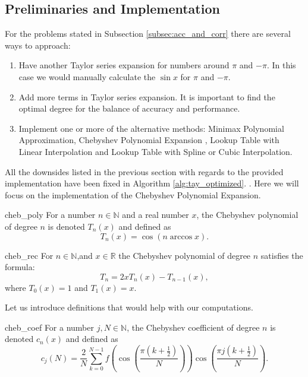 \documentclass[12pt]{article}
\begin{document}
\subsection{Preliminaries and Implementation}
For the problems stated in Subsection \ref{subsec:acc_and_corr} there are several ways to approach:
\begin{enumerate}
    \item Have another Taylor series expansion for numbers around $\pi$ and $-\pi$. In this case we would manually calculate the $\sin x$ for $\pi$ and $-\pi$.
    \item  Add more terms in Taylor series expansion. It is important to find the optimal degree for the balance of accuracy and performance.
    \item Implement one or more of the alternative methods: Minimax Polynomial Approximation, Chebyshev Polynomial Expansion \cite{press2007numerical}, Lookup Table with Linear Interpolation and Lookup Table with Spline or Cubic Interpolation.
\end{enumerate}
All the downsides listed in the previous section with regards to the provided implementation have been fixed in Algorithm \ref{alg:tay_optimized}.
.
Here we will focus on the implementation of the Chebyshev Polynomial Expansion.

\begin{DefinitionColor}{\cite[p~.233]{press2007numerical}}{cheb_poly}
    For a number $n\in \mathbb{N}$ and a real number $x$, the Chebyshev polynomial of degree $n$ is denoted $T_n(x)$ and defined as
    \begin{equation*}
        T_n(x) = \cos(n \arccos x).
    \end{equation*}
\end{DefinitionColor}

\begin{TheoremColor}{}{cheb_rec}
    For $n \in \mathbb{N}$,and $x \in \mathbb{R}$ the Chebyshev polynomial of degree $n$ satisfies the formula:
    \begin{equation*}
        T_n=2xT_n(x) - T_{n-1}(x),
    \end{equation*}
    where $T_0(x) =1$ and $T_1(x) = x$.
\end{TheoremColor}
Let us introduce definitions that would help with our computations.

\begin{DefinitionColor}{\cite[p~.234]{press2007numerical}}{cheb_coef}
    For a number $j, N\in \mathbb{N}$, the Chebyshev coefficient of degree $n$ is denoted $c_n(x)$ and defined as
    \begin{equation*}
        c_j(N) = \frac{2}{N} \sum_{k=0}^{N-1} f\left( \cos\left(  \frac{\pi(k+\frac{1}{2})}{N}\right)  \right) \cos \left(\frac{\pi j(k+\frac{1}{2})}{N}\right).
    \end{equation*}
\end{DefinitionColor}
\end{document}
